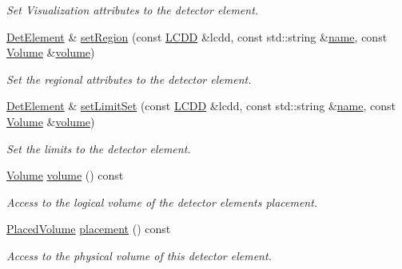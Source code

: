 \begin{DoxyCompactItemize}
\begin{DoxyCompactList}\small\item\em Set Visualization attributes to the detector element. \end{DoxyCompactList}\item 
\hyperlink{class_d_d4hep_1_1_geometry_1_1_det_element}{Det\+Element} \& \hyperlink{class_d_d4hep_1_1_geometry_1_1_det_element_a8101bdf68474877825b169fff8b0f42a}{set\+Region} (const \hyperlink{class_d_d4hep_1_1_geometry_1_1_l_c_d_d}{L\+C\+DD} \&lcdd, const std\+::string \&\hyperlink{class_d_d4hep_1_1_handle_a27c7d467a609ab32c133e1f3c7d85ef5}{name}, const \hyperlink{class_d_d4hep_1_1_geometry_1_1_volume}{Volume} \&\hyperlink{class_d_d4hep_1_1_geometry_1_1_det_element_a14e0d9333e42b32629beb57fee5af167}{volume})
\begin{DoxyCompactList}\small\item\em Set the regional attributes to the detector element. \end{DoxyCompactList}\item 
\hyperlink{class_d_d4hep_1_1_geometry_1_1_det_element}{Det\+Element} \& \hyperlink{class_d_d4hep_1_1_geometry_1_1_det_element_ad17fa6f9605dc731cf376b477bd794ff}{set\+Limit\+Set} (const \hyperlink{class_d_d4hep_1_1_geometry_1_1_l_c_d_d}{L\+C\+DD} \&lcdd, const std\+::string \&\hyperlink{class_d_d4hep_1_1_handle_a27c7d467a609ab32c133e1f3c7d85ef5}{name}, const \hyperlink{class_d_d4hep_1_1_geometry_1_1_volume}{Volume} \&\hyperlink{class_d_d4hep_1_1_geometry_1_1_det_element_a14e0d9333e42b32629beb57fee5af167}{volume})
\begin{DoxyCompactList}\small\item\em Set the limits to the detector element. \end{DoxyCompactList}\item 
\hyperlink{class_d_d4hep_1_1_geometry_1_1_volume}{Volume} \hyperlink{class_d_d4hep_1_1_geometry_1_1_det_element_a14e0d9333e42b32629beb57fee5af167}{volume} () const
\begin{DoxyCompactList}\small\item\em Access to the logical volume of the detector element\textquotesingle{}s placement. \end{DoxyCompactList}\item 
\hyperlink{class_d_d4hep_1_1_geometry_1_1_placed_volume}{Placed\+Volume} \hyperlink{class_d_d4hep_1_1_geometry_1_1_det_element_a3afa8e83d1f71cfb13df316193218769}{placement} () const
\begin{DoxyCompactList}\small\item\em Access to the physical volume of this detector element. \end{DoxyCompactList}\item 

\end{DoxyCompactItemize}
